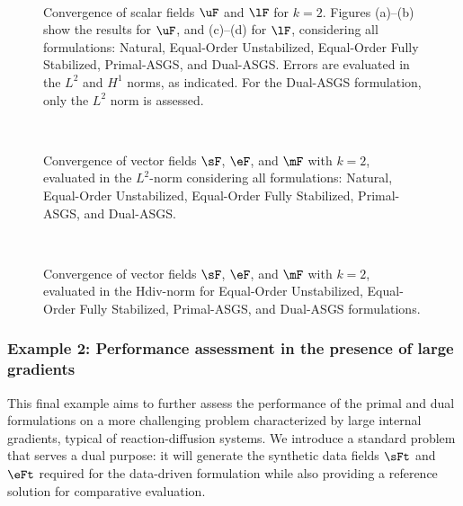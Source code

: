 
\begin{figure}[h!]
	\centering
	\caption{Convergence of scalar fields $\uF$ and $\lF$ for $k = 2$. Figures (a)--(b) show the results for $\uF$, and (c)--(d) for $\lF$, considering all formulations: Natural, Equal-Order Unstabilized, Equal-Order Fully Stabilized, Primal-ASGS, and Dual-ASGS. Errors are evaluated in the $L^2$ and $H^1$ norms, as indicated. For the Dual-ASGS formulation, only the $L^2$ norm is assessed.}
	~\\
	\def\svgwidth{1.0\columnwidth}
	
	\label{fig:convergence_scalar_quadratic_art02}
\end{figure}

\begin{figure}[h!]
	\centering
	\caption{Convergence of vector fields $\sF$, $\eF$, and $\mF$ with $k=2$, evaluated in the $L^{2}$-norm considering all formulations: Natural, Equal-Order Unstabilized, Equal-Order Fully Stabilized, Primal-ASGS, and Dual-ASGS.}
	~\\
	\def\svgwidth{1.0\columnwidth}
	
	\label{fig:convergence_vector_quadratic_art02}
\end{figure}

\begin{figure}[h!]
	\centering
	\caption{Convergence of vector fields $\sF$, $\eF$, and $\mF$ with $k=2$, evaluated in the Hdiv-norm for Equal-Order Unstabilized, Equal-Order Fully Stabilized, Primal-ASGS, and Dual-ASGS formulations.}
	~\\
	\def\svgwidth{1.0\columnwidth}
	
	\label{fig:convergence_vector_quadratic_hdiv_art02}
\end{figure}

\clearpage
\subsubsection{Example 2: Performance assessment in the presence of large gradients}

This final example aims to further assess the performance of the primal and dual formulations on a more challenging problem characterized by large internal gradients, typical of reaction-diffusion systems. We introduce a standard problem that serves a dual purpose: it will generate the synthetic data fields $\sFt$ and $\eFt$ required for the data-driven formulation while also providing a reference solution for comparative evaluation.

